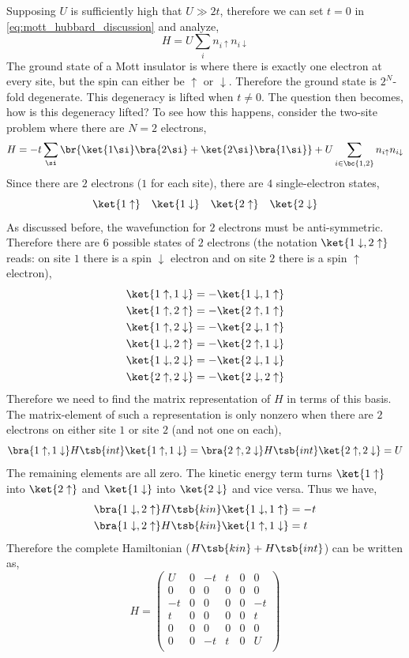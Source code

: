 \documentclass{article}
\newcommand{\uu}{\uparrow}
\newcommand{\dd}{\downarrow}
\begin{document}
Supposing $U$ is sufficiently high that $U \gg 2t$, therefore we can set $t = 0$ in \cref{eq:mott_hubbard_discussion} and analyze,
\[ H = U \sum_{i} n_{i \uu} n_{i \dd}  \]
The ground state of a Mott insulator is where there is exactly one electron at every site, but the spin can either be $\uu$ or $\dd$. Therefore the ground state is $2^{N}$-fold degenerate. This degeneracy is lifted when $t \neq 0$. The question then becomes, how is this degeneracy lifted? To see how this happens, consider the two-site problem where there are $N = 2$ electrons,
\[ H = - t\sum_{\si} \br{\ket{1\si} \bra{2\si} + \ket{2\si} \bra{1\si}} + U \sum_{i \in \bc{1,2}} n_{i \uu} n_{i \dd} \]
Since there are $2$ electrons ($1$ for each site), there are $4$ single-electron states,
\[ \ket{1 \uu} \quad \ket{1 \dd} \quad \ket{2 \uu} \quad \ket{2 \dd} \]
As discussed before, the wavefunction for $2$ electrons must be anti-symmetric. Therefore there are $6$ possible states of $2$ electrons (the notation $\ket{1\dd, 2\uu}$ reads: on site $1$ there is a spin $\dd$ electron and on site $2$ there is a spin $\uu$ electron),
\begin{align*}
    \ket{1\uu, 1\dd} &= -\ket{1\dd, 1\uu} \\
    \ket{1\uu, 2\uu} &= -\ket{2\uu, 1\uu} \\
    \ket{1\uu, 2\dd} &= -\ket{2\dd, 1\uu} \\
    \ket{1\dd, 2\uu} &= -\ket{2\uu, 1\dd} \\
    \ket{1\dd, 2\dd} &= -\ket{2\dd, 1\dd} \\
    \ket{2\uu, 2\dd} &= -\ket{2\dd, 2\uu}
\end{align*}
Therefore we need to find the matrix representation of $H$ in terms of this basis. The matrix-element of such a representation is only nonzero when there are $2$ electrons on either site $1$ or site $2$ (and not one on each),
\[ \bra{1 \uu, 1 \dd} H\tsb{int} \ket{1 \uu, 1 \dd} = \bra{2 \uu, 2 \dd} H\tsb{int} \ket{2 \uu, 2 \dd} = U \]
The remaining elements are all zero. The kinetic energy term turns $\ket{1 \uu}$ into $\ket{2 \uu}$ and $\ket{1 \dd}$ into $\ket{2 \dd}$ and vice versa. Thus we have,
\begin{align*}
\bra{1 \dd, 2 \uu} H\tsb{kin} \ket{1 \dd, 1 \uu} &= -t \\
\bra{1 \dd, 2 \uu} H\tsb{kin} \ket{1 \uu, 1 \dd} &= t
\end{align*}
Therefore the complete Hamiltonian ($H\tsb{kin} + H\tsb{int}$) can be written as,
\[ H = \begin{pmatrix}
    U & 0 & -t & t & 0 & 0 \\
    0 & 0 & 0 & 0 & 0 & 0 \\
    -t & 0 & 0 & 0 & 0 & -t \\
    t & 0 & 0 & 0 & 0 & t \\
    0 & 0 & 0 & 0 & 0 & 0 \\
    0 & 0 & -t & t & 0 & U \\
\end{pmatrix} \]
\end{document}
